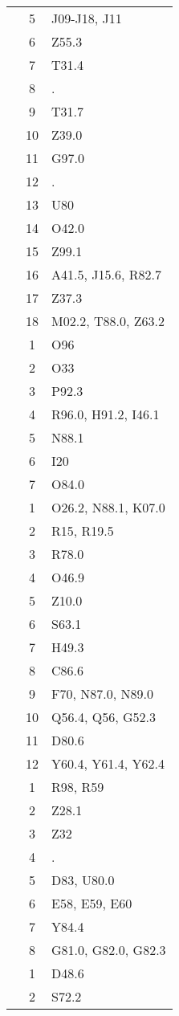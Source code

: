 \begin{table}[htbp]
\begin{tabular}{c c l}
	 & 5 & J09-J18, J11 \\
	 & 6 & Z55.3 \\
	 & 7 & T31.4 \\
	 & 8 & . \\
	 & 9 & T31.7 \\
	 & 10 & Z39.0 \\
	 & 11 & G97.0 \\
	 & 12 & . \\
	 & 13 & U80 \\
	 & 14 & O42.0 \\
	 & 15 & Z99.1 \\
	 & 16 & A41.5, J15.6, R82.7 \\
	 & 17 & Z37.3 \\
	 & 18 & M02.2, T88.0, Z63.2 \\
	\addlinespace
	4 & 1 & O96 \\
	 & 2 & O33 \\
	 & 3 & P92.3 \\
	 & 4 & R96.0, H91.2, I46.1 \\
	 & 5 & N88.1 \\
	 & 6 & I20 \\
	 & 7 & O84.0 \\
	\addlinespace
	5 & 1 & O26.2, N88.1, K07.0 \\
	 & 2 & R15, R19.5 \\
	 & 3 & R78.0 \\
	 & 4 & O46.9 \\
	 & 5 & Z10.0 \\
	 & 6 & S63.1 \\
	 & 7 & H49.3 \\
	 & 8 & C86.6 \\
	 & 9 & F70, N87.0, N89.0 \\
	 & 10 & Q56.4, Q56, G52.3 \\
	 & 11 & D80.6 \\
	 & 12 & Y60.4, Y61.4, Y62.4 \\
	\addlinespace
	6 & 1 & R98, R59 \\
	 & 2 & Z28.1 \\
	 & 3 & Z32 \\
	 & 4 & . \\
	 & 5 & D83, U80.0 \\
	 & 6 & E58, E59, E60 \\
	 & 7 & Y84.4 \\
	 & 8 & G81.0, G82.0, G82.3 \\
	\addlinespace
	7 & 1 & D48.6 \\
	 & 2 & S72.2 \\

\end{tabular}
\end{table}
